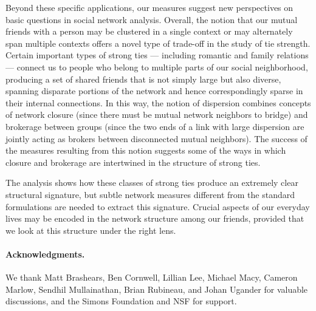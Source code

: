 \documentclass{sigchi}
\newcommand{\omt}[1]{}
\newcommand{\xhdr}[1]{\paragraph*{\bf #1.}}
\begin{document}
Beyond these specific applications, our measures suggest
new perspectives on basic questions in social network analysis.
Overall, the notion that our mutual friends with a person may
be clustered in a single context or may alternately span multiple contexts
offers a novel type of trade-off in the study of tie strength.
Certain important types of strong ties ---
including romantic and family relations ---
connect us to people who belong to multiple
parts of our social neighborhood, producing a set of shared friends
that is not simply large but also diverse, spanning disparate
portions of the network and hence correspondingly sparse in
their internal connections.
In this way, the notion of dispersion
combines concepts of network 
closure\cite{granovetter-embeddedness,coleman-social-capital}
(since there must be mutual network neighbors to bridge) and 
brokerage between groups\cite{burt-struct-holes-book}
(since the two ends of a link with large dispersion
are jointly acting as brokers between disconnected
mutual neighbors).  
The success of the measures resulting from this notion
suggests some of the ways in which closure and brokerage
are intertwined in the structure of strong ties.

The analysis shows how these classes of strong ties produce
an extremely clear structural signature, but subtle network
measures different from the standard formulations 
are needed to extract this signature.
Crucial aspects of our everyday lives may be encoded in the network
structure among our friends, provided that we look at this structure
under the right lens.





\xhdr{Acknowledgments}
We thank Matt Brashears, Ben Cornwell, Lillian Lee, 
Michael Macy, Cameron Marlow,
Sendhil Mullainathan, Brian Rubineau, and Johan Ugander
for valuable discussions,
and the Simons Foundation and NSF for support.



\end{document}
